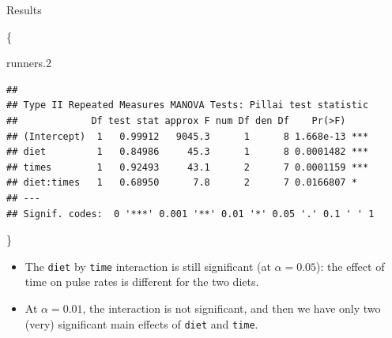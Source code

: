 \documentclass[ignorenonframetext,]{beamer}
\newenvironment{Shaded}{\begin{snugshade}}{\end{snugshade}}
\newcommand{\FloatTok}[1]{\textcolor[rgb]{0.00,0.00,0.81}{#1}}
\newcommand{\NormalTok}[1]{#1}
\begin{document}
\begin{frame}[fragile]{Results}
\protect\hypertarget{results-1}{}

\{\footnotesize

\begin{Shaded}
\begin{Highlighting}[]
\NormalTok{runners}\FloatTok{.2}
\end{Highlighting}
\end{Shaded}

\begin{verbatim}
## 
## Type II Repeated Measures MANOVA Tests: Pillai test statistic
##             Df test stat approx F num Df den Df    Pr(>F)    
## (Intercept)  1   0.99912   9045.3      1      8 1.668e-13 ***
## diet         1   0.84986     45.3      1      8 0.0001482 ***
## times        1   0.92493     43.1      2      7 0.0001159 ***
## diet:times   1   0.68950      7.8      2      7 0.0166807 *  
## ---
## Signif. codes:  0 '***' 0.001 '**' 0.01 '*' 0.05 '.' 0.1 ' ' 1
\end{verbatim}

\}

\begin{itemize}
\item
  The \texttt{diet} by \texttt{time} interaction is still significant
  (at \(\alpha=0.05\)): the effect of time on pulse rates is different
  for the two diets.
\item
  At \(\alpha=0.01\), the interaction is not significant, and then we
  have only two (very) significant main effects of \texttt{diet} and
  \texttt{time}.
\end{itemize}

\end{frame}
\end{document}

